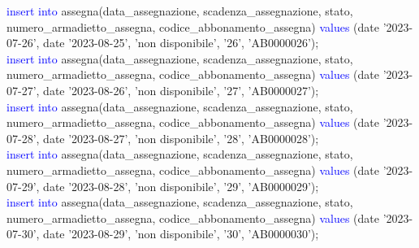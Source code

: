 \documentclass{article}
\begin{document}
\begin{flushleft}
{        \vspace{2mm}
        \hspace*{0.5em}\textcolor{blue}{insert into} assegna(data\_assegnazione, scadenza\_assegnazione, stato, \hspace*{0.5em}numero\_armadietto\_assegna, codice\_abbonamento\_assegna) \textcolor{blue}{values} \hspace*{0.5em}(date \hspace*{0.5em}'2023-07-26', date '2023-08-25', 'non disponibile', '26', 'AB0000026'); \\
        \vspace{2mm}
        \hspace*{0.5em}\textcolor{blue}{insert into} assegna(data\_assegnazione, scadenza\_assegnazione, stato, \hspace*{0.5em}numero\_armadietto\_assegna, codice\_abbonamento\_assegna) \textcolor{blue}{values} \hspace*{0.5em}(date \hspace*{0.5em}'2023-07-27', date '2023-08-26', 'non disponibile', '27', 'AB0000027'); \\
        \vspace{2mm}
        \hspace*{0.5em}\textcolor{blue}{insert into} assegna(data\_assegnazione, scadenza\_assegnazione, stato, \hspace*{0.5em}numero\_armadietto\_assegna, codice\_abbonamento\_assegna) \textcolor{blue}{values} \hspace*{0.5em}(date \hspace*{0.5em}'2023-07-28', date '2023-08-27', 'non disponibile', '28', 'AB0000028'); \\
        \vspace{2mm}
        \hspace*{0.5em}\textcolor{blue}{insert into} assegna(data\_assegnazione, scadenza\_assegnazione, stato, \hspace*{0.5em}numero\_armadietto\_assegna, codice\_abbonamento\_assegna) \textcolor{blue}{values} \hspace*{0.5em}(date \hspace*{0.5em}'2023-07-29', date '2023-08-28', 'non disponibile', '29', 'AB0000029'); \\
        \vspace{2mm}
        \hspace*{0.5em}\textcolor{blue}{insert into} assegna(data\_assegnazione, scadenza\_assegnazione, stato, \hspace*{0.5em}numero\_armadietto\_assegna, codice\_abbonamento\_assegna) \textcolor{blue}{values} \hspace*{0.5em}(date \hspace*{0.5em}'2023-07-30', date '2023-08-29', 'non disponibile', '30', 'AB0000030'); \\
}
\end{flushleft}
\end{document}
